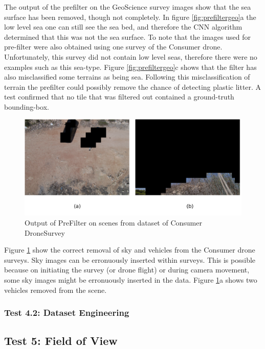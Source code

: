 \documentclass{IEEEtran}
\begin{document}
The output of the prefilter on the GeoScience survey images show that the sea surface has been removed, though not completely. In figure \ref{fig:prefiltergeo}a the low level sea one can still see the sea bed, and therefore the CNN algorithm determined that this was not the sea surface. To note that the images used for pre-filter were also obtained using one survey of the Consumer drone. Unfortunately, this survey did not contain low level seas, therefore there were no examples such as this sea-type. Figure \ref{fig:prefiltergeo}c shows that the filter has also misclassified some terrains as being sea. Following this misclassification of terrain the prefilter could possibly remove the chance of detecting plastic litter. A test confirmed that no tile that was filtered out contained a ground-truth bounding-box. 

\begin{figure}[H]
\centering
\includegraphics[scale=0.5]{images/filter-test.png}
\caption{Output of PreFilter on scenes from dataset of Consumer DroneSurvey}
\label{fig:prefiltertest}
\end{figure}

Figure \ref{fig:prefiltertest} show the correct removal of sky and vehicles from the Consumer drone surveys. Sky images can be erronuously inserted within surveys. This is possible because on initiating the survey (or drone flight) or during camera movement, some sky images might be erronuously inserted in the data. Figure \ref{fig:prefiltertest}a shows two vehicles removed from the scene. 




\subsubsection{Test 4.2: Dataset Engineering}

\subsection{Test 5: Field of View}
\end{document}
